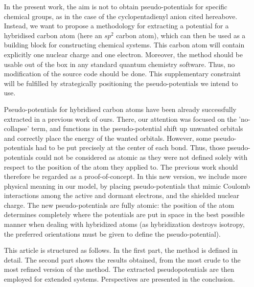 \documentclass[journal=jctcce,manuscript=article]{achemso}
\begin{document}

In the present work, the aim is not to obtain pseudo-potentials for  specific
chemical groups, as in the case of the cyclopentadienyl anion cited hereabove.
Instead, we want to propose a methodology for extracting a potential for
a hybridised carbon atom (here an $sp^2$ carbon atom), which can then be
used as a building block for constructing chemical systems. This carbon atom
will contain explicitly one nuclear charge and one electron.
Moreover, the method should be usable 
out of the box in any standard quantum chemistry software.
Thus, no modification of the source code should be done.
This supplementary constraint will be fulfilled by strategically positioning the pseudo-potentials
we intend to use. 

Pseudo-potentials for hybridised carbon
atoms have been already successfully extracted in a previous work of ours.\cite{drujon_pseudopotentials_2013}
There, our attention was focused on the 'no-collapse' term, and 
functions in the pseudo-potential shift up unwanted orbitals and correctly place the energy of the
wanted orbitals.
However, some pseudo-potentials had to be put precisely at the center
of each bond.
Thus, those pseudo-potentials could not be considered as atomic as they were not defined solely
with respect to the position of the atom they applied to. The previous work should therefore be regarded as a proof-of-concept.
In this new version, we include more physical meaning in our model, 
by placing pseudo-potentials that mimic Coulomb interactions among the active and dormant electrons, and the shielded nuclear charge. 
The new pseudo-potentials are fully atomic: the position of the atom
determines completely where the potentials are put in space in the best possible manner
when dealing with hybridized atoms (as hybridization destroys isotropy, the preferred orientations
must be given to define the pseudo-potential).

This article is structured as follows.
In the first part, the method is defined in detail.
The second part shows the results obtained, from the most crude to the most refined
version of the method.
The extracted pseudopotentials are then employed for extended systems.
Perspectives are presented in the conclusion.
\end{document}
